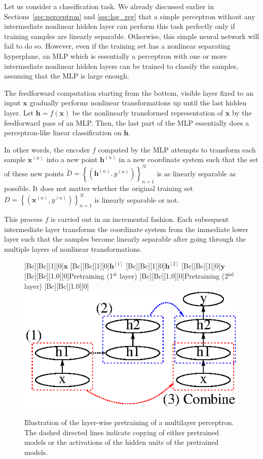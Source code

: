 \documentclass{now}
\newcommand{\qlay}[1]{\left[#1\right]}
\newcommand{\vect}[1]{\mathbf{#1}}
\newcommand{\vh}[0]{\vect{h}}
\newcommand{\vx}[0]{\vect{x}}
\newcommand{\vy}[0]{\vect{y}}
\begin{document}
Let us consider a classification task. We already discussed earlier in
Sections~\ref{sec:perceptron} and \ref{sec:log_reg} that a simple perceptron
without any intermediate nonlinear hidden layer can perform this task perfectly
only if training samples are linearly separable. Otherwise, this simple neural
network will fail to do so.  However, even if the training set has a nonlinear
separating hyperplane, an MLP which is essentially a perceptron with one or more
intermediate nonlinear hidden layers can be trained to classify the samples,
assuming that the MLP is large enough.

The feedforward computation starting from the bottom, visible layer fixed to an
input $\vx$ gradually performs nonlinear transformations up until the last
hidden layer.  Let $\vh=f(\vx)$ be the nonlinearly transformed representation of
$\vx$ by the feedforward pass of an MLP.  Then, the last part of the MLP
essentially does a perceptron-like linear classification on $\vh$.

In other words, the encoder $f$ computed by the MLP attempts to transform each
sample $\vx^{(n)}$ into a new point $\vh^{(n)}$ in a new coordinate system such
that the set of these new points $\tilde{D} = \left\{ (\vh^{(n)}, y^{(n)})
\right\}_{n=1}^N$ is as linearly separable as possible. It does not matter
whether the original training set $D=\left\{ (\vx^{(n)},y^{(n)})
\right\}_{n=1}^N$ is linearly separable or not.

This process $f$ is carried out in an incremental fashion.  Each subsequent
intermediate layer transforms the coordinate system from the immediate lower
layer such that the samples become linearly separable after going through the
multiple layers of nonlinear transformations.

\begin{figure}[t]
    \centering
    [Bc][Bc][1][0]{$\vx$}
    [Bc][Bc][1][0]{$\vh^{\qlay{1}}$}
    [Bc][Bc][1][0]{$\vh^{\qlay{2}}$}
    [Bc][Bc][1][0]{$\vy$}
    [Bc][Bc][1.0][0]{Pretraining
    (1$^\text{st}$ layer)}
    [Bc][Bc][1.0][0]{Pretraining
    (2$^\text{nd}$ layer)}
    [Bc][Bc][1.0][0]{}
    \includegraphics[width=0.7\columnwidth]{../figures/pretrain_mlp.eps}
    \caption{Illustration of the layer-wise pretraining of a multilayer
        perceptron. The dashed directed lines indicate copying of
    either pretrained models or the activations of the hidden units of the
pretrained models.}
    \label{fig:incr_feat}
\end{figure}
\end{document}
